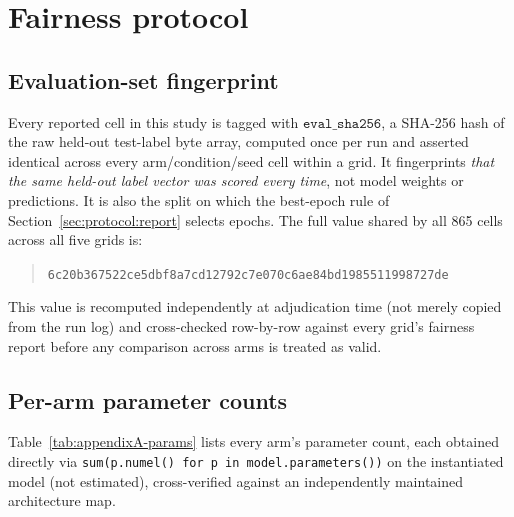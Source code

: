 \section{Fairness protocol}
\label{app:fairness}

\subsection{Evaluation-set fingerprint}
\label{app:fairness:fingerprint}

Every reported cell in this study is tagged with $\mathtt{eval\_sha256}$, a SHA-256 hash of the raw held-out test-label byte array, computed once per run and asserted identical across every arm/condition/seed cell within a grid. It fingerprints \emph{that the same held-out label vector was scored every time}, not model weights or predictions. It is also the split on which the best-epoch rule of Section~\ref{sec:protocol:report} selects epochs. The full value shared by all 865 cells across all five grids is:
\begin{quote}
\texttt{\scriptsize 6c20b367\allowbreak 522ce5db\allowbreak f8a7cd12\allowbreak 792c7e07\allowbreak 0c6ae84b\allowbreak d1985511\allowbreak 998727de}
\end{quote}
This value is recomputed independently at adjudication time (not merely copied from the run log) and cross-checked row-by-row against every grid's fairness report before any comparison across arms is treated as valid.

\subsection{Per-arm parameter counts}
\label{app:fairness:params}

Table~\ref{tab:appendixA-params} lists every arm's parameter count, each obtained directly via \texttt{sum(p.numel() for p in model.parameters())} on the instantiated model (not estimated), cross-verified against an independently maintained architecture map.


